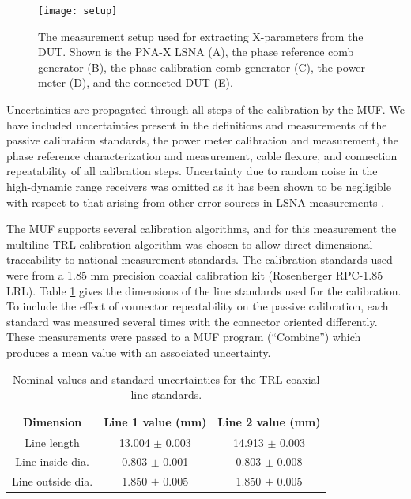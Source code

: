 \documentclass[../thesis/thesis.tex]{subfiles}
\begin{document}
\begin{refsection}
\begin{figure}[t]
	\centering
	\texttt{[image: setup]}
	\caption{The measurement setup used for extracting X-parameters from the DUT. Shown is the PNA-X LSNA (A), the phase reference comb generator (B), the phase calibration comb generator (C), the power meter (D), and the connected DUT (E).}
	\label{ch5_fig_setup}
\end{figure}

Uncertainties are propagated through all steps of the calibration by the MUF. We have included uncertainties present in the definitions and measurements of the passive calibration standards, the power meter calibration and measurement, the phase reference characterization and measurement, cable flexure, and connection repeatability of all calibration steps. Uncertainty due to random noise in the high-dynamic range receivers was omitted as it has been shown to be negligible with respect to that arising from other error sources in LSNA measurements \cite{Blockley_2007}.

The MUF supports several calibration algorithms, and for this measurement the multiline TRL calibration algorithm \cite{Engen_1979, Marks_1991} was chosen to allow direct dimensional traceability to national measurement standards. The calibration standards used were from a 1.85 mm precision coaxial calibration kit (Rosenberger RPC-1.85 LRL). Table \ref{ch5_table_passivestds} gives the dimensions of the line standards used for the calibration. To include the effect of connector repeatability on the passive calibration, each standard was measured several times with the connector oriented differently. These measurements were passed to a MUF program (``Combine'') which produces a mean value with an associated uncertainty.

\begin{table}[]
	\centering
	\caption{Nominal values and standard uncertainties for the TRL coaxial line standards.}
	\label{ch5_table_passivestds}
	\begin{tabular}{ccc}
		\hline
		Dimension         & Line 1 value (mm) & Line 2 value (mm) \\ \hline
		Line length       & 13.004 $\pm$ 0.003 & 14.913 $\pm$ 0.003 \\
		Line inside dia.  & 0.803 $\pm$ 0.001 & 0.803 $\pm$ 0.008 \\
		Line outside dia. & 1.850 $\pm$ 0.005 & 1.850 $\pm$ 0.005 \\ \hline            
	\end{tabular}
\end{table}


\end{refsection}
\end{document}
